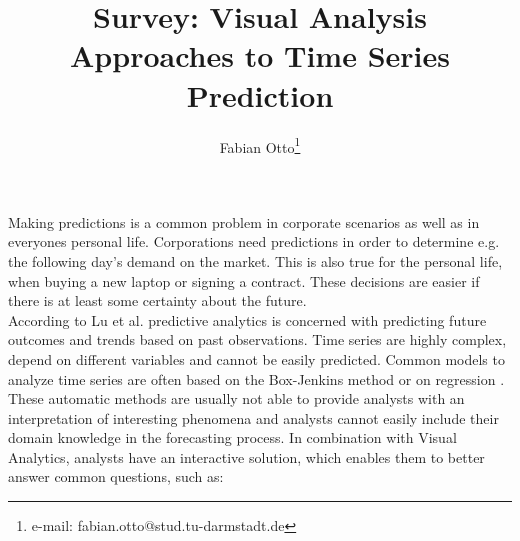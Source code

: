 \documentclass[electronic]{vgtc}             %
\title{Survey: Visual Analysis Approaches to Time Series Prediction}
\author{Fabian Otto\thanks{e-mail: fabian.otto@stud.tu-darmstadt.de}}
\affiliation{\scriptsize Technische Universit\"at Darmstadt}
\begin{document}

\maketitle

Making predictions is a common problem in corporate scenarios as well as in everyones personal life. 
Corporations need predictions in order to determine e.g. the following day's demand on the market.
This is also true for the personal life, when buying a new laptop or signing a contract.
These decisions are easier if there is at least some certainty about the future.\\
According to Lu et al. \cite{Lu:2017} predictive analytics is concerned with predicting future outcomes and trends based on past observations.
Time series are highly complex, depend on different variables and cannot be easily predicted. 
Common models to analyze time series are often based on the Box-Jenkins method \cite{box:2015} or on regression \cite{draper:2014}.
These automatic methods are usually not able to provide analysts with an interpretation of interesting phenomena and analysts cannot easily include their domain knowledge in the forecasting process.
In combination with Visual Analytics, analysts have an interactive solution, which enables them to better answer common questions, such as: 
\end{document}

